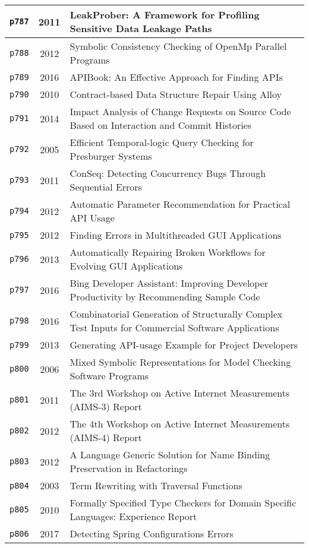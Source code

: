 \begin{longtable}{| c | c | p{16cm} |}
  \hline
  \texttt{p787} & 2011 & LeakProber: A Framework for Profiling Sensitive Data Leakage Paths \\
  \hline
  \texttt{p788} & 2012 & Symbolic Consistency Checking of OpenMp Parallel Programs \\
  \hline
  \texttt{p789} & 2016 & APIBook: An Effective Approach for Finding APIs \\
  \hline
  \texttt{p790} & 2010 & Contract-based Data Structure Repair Using Alloy \\
  \hline
  \texttt{p791} & 2014 & Impact Analysis of Change Requests on Source Code Based on Interaction and Commit Histories \\
  \hline
  \texttt{p792} & 2005 & Efficient Temporal-logic Query Checking for Presburger Systems \\
  \hline
  \texttt{p793} & 2011 & ConSeq: Detecting Concurrency Bugs Through Sequential Errors \\
  \hline
  \texttt{p794} & 2012 & Automatic Parameter Recommendation for Practical API Usage \\
  \hline
  \texttt{p795} & 2012 & Finding Errors in Multithreaded GUI Applications \\
  \hline
  \texttt{p796} & 2013 & Automatically Repairing Broken Workflows for Evolving GUI Applications \\
  \hline
  \texttt{p797} & 2016 & Bing Developer Assistant: Improving Developer Productivity by Recommending Sample Code \\
  \hline
  \texttt{p798} & 2016 & Combinatorial Generation of Structurally Complex Test Inputs for Commercial Software Applications \\
  \hline
  \texttt{p799} & 2013 & Generating API-usage Example for Project Developers \\
  \hline
  \texttt{p800} & 2006 & Mixed Symbolic Representations for Model Checking Software Programs \\
  \hline
  \texttt{p801} & 2011 & The 3rd Workshop on Active Internet Measurements (AIMS-3) Report \\
  \hline
  \texttt{p802} & 2012 & The 4th Workshop on Active Internet Measurements (AIMS-4) Report \\
  \hline
  \texttt{p803} & 2012 & A Language Generic Solution for Name Binding Preservation in Refactorings \\
  \hline
  \texttt{p804} & 2003 & Term Rewriting with Traversal Functions \\
  \hline
  \texttt{p805} & 2010 & Formally Specified Type Checkers for Domain Specific Languages: Experience Report \\
  \hline
  \texttt{p806} & 2017 & Detecting Spring Configurations Errors \\
  \hline
\end{longtable}
